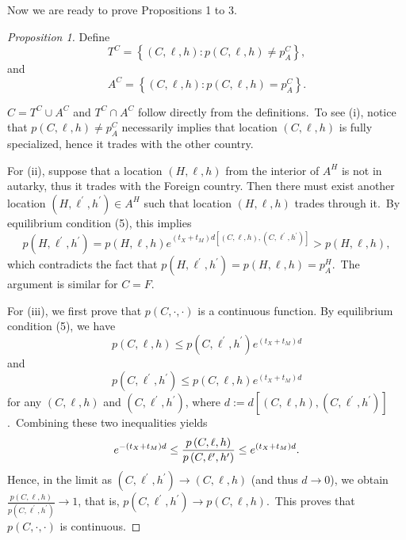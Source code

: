 \documentclass[12pt]{article}
\begin{document}
Now we are ready to prove Propositions 1 to 3.

\begin{proof}[Proposition 1]
Define%
\begin{equation*}
T^{C}=\left \{ \left( C,\ell ,h\right) :p\left( C,\ell ,h\right) \neq
p_{A}^{C}\right \} ,
\end{equation*}%
and%
\begin{equation*}
A^{C}=\left \{ \left( C,\ell ,h\right) :p\left( C,\ell ,h\right)
=p_{A}^{C}\right \} .
\end{equation*}

$C=T^{C}\cup A^{C}$ and $T^{C}\cap A^{C}$ follow directly from the
definitions.\ To see (i), notice that $p\left( C,\ell ,h\right) \neq
p_{A}^{C}$ necessarily implies that location $\left( C,\ell ,h\right) $ is
fully specialized, hence it trades with the other country.

For (ii), suppose that a location $\left( H,\ell ,h\right) $ from the
interior of $A^{H}$ is not in autarky, thus it trades with the Foreign
country. Then there must exist another location $\left( H,\ell ^{\prime
},h^{\prime }\right) \in A^{H}$ such that location $\left( H,\ell ,h\right) $
trades through it.\ By equilibrium condition (5), this implies%
\begin{equation*}
p\left( H,\ell ^{\prime },h^{\prime }\right) =p\left( H,\ell ,h\right)
e^{\left( t_{X}+t_{M}\right) d\left[ \left( C,\ell ,h\right) ,\left( C,\ell
^{\prime },h^{\prime }\right) \right] }>p\left( H,\ell ,h\right) ,
\end{equation*}%
which contradicts the fact that $p\left( H,\ell ^{\prime },h^{\prime
}\right) =p\left( H,\ell ,h\right) =p_{A}^{H}$.\ The argument is similar for 
$C=F$.

For (iii), we first prove that $p\left( C,\cdot ,\cdot \right) $ is a
continuous function. By equilibrium condition (5), we have%
\begin{equation*}
p\left( C,\ell ,h\right) \leq p\left( C,\ell ^{\prime },h^{\prime }\right)
e^{\left( t_{X}+t_{M}\right) d}
\end{equation*}%
and%
\begin{equation*}
p\left( C,\ell ^{\prime },h^{\prime }\right) \leq p\left( C,\ell ,h\right)
e^{\left( t_{X}+t_{M}\right) d}
\end{equation*}%
for any $\left( C,\ell ,h\right) $ and $\left( C,\ell ^{\prime },h^{\prime
}\right) $, where $d:=d\left[ \left( C,\ell ,h\right) ,\left( C,\ell
^{\prime },h^{\prime }\right) \right] $.\ Combining these two inequalities
yields%
\begin{equation*}
e^{-\left( t_{X}+t_{M}\right) d}\leq \frac{p\left( C,\ell ,h\right) }{%
p\left( C,\ell ^{\prime },h^{\prime }\right) }\leq e^{\left(
t_{X}+t_{M}\right) d}.
\end{equation*}%
Hence, in the limit as $\left( C,\ell ^{\prime },h^{\prime }\right)
\rightarrow \left( C,\ell ,h\right) $ (and thus $d\rightarrow 0$), we obtain 
$\frac{p\left( C,\ell ,h\right) }{p\left( C,\ell ^{\prime },h^{\prime
}\right) }\rightarrow 1$, that is, $p\left( C,\ell ^{\prime },h^{\prime
}\right) \rightarrow p\left( C,\ell ,h\right) $.\ This proves that $p\left(
C,\cdot ,\cdot \right) $ is continuous.


\end{proof}
\end{document}
